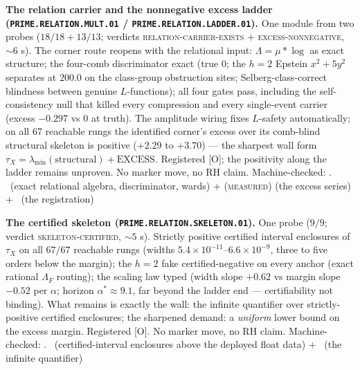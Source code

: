 \par\smallskip\noindent\textbf{The relation carrier and the
nonnegative excess ladder (\texttt{PRIME.RELATION.MULT.01} /
\texttt{PRIME.RELATION.LADDER.01}).}
One module from two probes ($18/18 + 13/13$; verdicts
\textsc{relation-carrier-exists} $+$ \textsc{excess-nonnegative},
$\sim6$ s).  The corner route reopens with the relational input:
$\Lambda = \mu * \log$ as exact structure; the four-comb
discriminator exact (true $0$; the $h = 2$ Epstein $x^2 + 5y^2$
separates at $200.0$ on the class-group obstruction sites;
Selberg-class-correct blindness between genuine $L$-functions);
all four gates pass, including the self-consistency null that
killed every compression and every single-event carrier (excess
$-0.297$ vs $0$ at truth).  The amplitude wiring fixes
$L$-safety automatically; on all $67$ reachable rungs the
identified corner's excess over its comb-blind structural
skeleton is positive ($+2.29$ to $+3.70$) --- the sharpest wall
form $\tau_X = \lambda_{\min}(\text{structural}) + \text{EXCESS}$.
Registered [O]; the positivity along the ladder remains unproven.
No marker move, no RH claim.
Machine-checked: .
\mE\ (exact relational algebra, discriminator, wards) $+$
(\textsc{measured}) (the excess series) $+$ \mO\ (the
registration)
\par\smallskip


\par\smallskip\noindent\textbf{The certified skeleton
(\texttt{PRIME.RELATION.SKELETON.01}).}
One probe ($9/9$; verdict \textsc{skeleton-certified}, $\sim5$ s).
Strictly positive certified interval enclosures of $\tau_X$ on all
$67/67$ reachable rungs (widths
$5.4\times10^{-11}$--$6.6\times10^{-9}$, three to five orders
below the margin); the $h = 2$ fake certified-negative on every
anchor (exact rational $\Lambda_F$ routing); the scaling law typed
(width slope $+0.62$ vs margin slope $-0.52$ per $\alpha$; horizon
$\alpha^* \approx 9.1$, far beyond the ladder end ---
certifiability not binding).  What remains is exactly the wall:
the infinite quantifier over strictly-positive certified
enclosures; the sharpened demand: a \emph{uniform} lower bound on
the excess margin.  Registered [O].  No marker move, no RH claim.
Machine-checked: .
\mE\ (certified-interval enclosures above the deployed float
data) $+$ \mO\ (the infinite quantifier)
\par\smallskip


